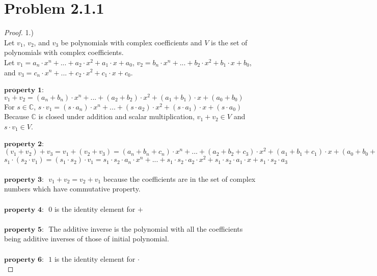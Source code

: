 \documentclass[12pt]{article}
\begin{document}
\newpage 

\section{Problem 2.1.1}

\begin{proof}
	1.)
 \\ Let $v_1$, $v_2$, and $v_3$ be polynomials with complex coefficients and $V$ is the set of polynomials with complex coefficients.
 \\ Let $v_1 = a_n \cdot x^n + ... + a_2 \cdot x^2 + a_1 \cdot x + a_0$, $v_2 = b_n \cdot x^n + ... + b_2 \cdot x^2 + b_1 \cdot x + b_0$, and $v_3 = c_n \cdot x^n + ... + c_2 \cdot x^2 + c_1 \cdot x + c_0$.
 \\
 \\$\textbf {property 1: }$
 \\$v_1 + v_2 = (a_n + b_n) \cdot x^n + ... +(a_2 + b_2) \cdot x^2 +(a_1 + b_1) \cdot x + (a_0 + b_0) $
 \\ For $s \in \mathbb{C}$, $s \cdot v_1 = (s \cdot a_n) \cdot x^n + ... + (s \cdot a_2) \cdot x^2 + (s \cdot a_1) \cdot x + (s \cdot a_0)$
 \\Because $\mathbb{C}$ is closed under addition and scalar multiplication, $v_1+v_2 \in V$ and $s \cdot v_1 \in V$.
 \\
 \\$\textbf {property 2: }$
 $(v_1+v_2)+v_3 = v_1+(v_2+v_3) = (a_n+b_n+c_n) \cdot x^n + ... +(a_2+b_2+c_3) \cdot x^2+(a_1+b_1+c_1) \cdot x + (a_0+b_0+c_0) $
 \\ $s_1\cdot(s_2\cdot v_1)=(s_1 \cdot s_2)\cdot v_1=s_1 \cdot s_2 \cdot a_n \cdot x^n+...+s_1 \cdot s_2 \cdot a_2 \cdot x^2 + s_1 \cdot s_2 \cdot a_1 \cdot x + s_1 \cdot s_2 \cdot a_3$
 \\
 \\$\textbf {property 3: }$
 $v_1+v_2 = v_2+v_1$ because the coefficients are in the set of complex numbers which have commutative property.
 \\
 \\$\textbf {property 4: }$
 $0$ is the identity element for $+$
 \\
 \\$\textbf {property 5: }$
 The additive inverse is the polynomial with all the coefficients being additive inverses of those of initial polynomial.
 \\
 \\$\textbf {property 6: }$
 $1$ is the identity element for $\cdot$
 \\

\end{proof}
\end{document}
